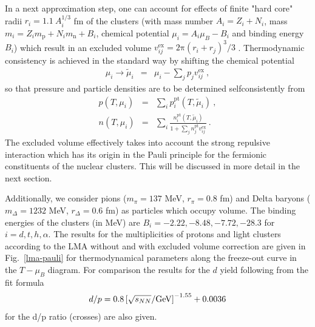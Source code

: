\documentclass[epj]{svjour}
\begin{document}
In a next approximation step, one can account for effects of finite "hard core" radii $r_i=1.1~A_i^{1/3}$ fm 
of the clusters (with mass number $A_i=Z_i+N_i$, mass $m_i=Z_i m_\mathrm p + N_i m_\mathrm n + B_i$, chemical potential $\mu_i=A_i \mu_B-B_i$ and binding energy $B_i$) which result in an excluded volume 
$v^\mathrm{ex}_{ij} = \mathrm{2\pi} (r_i + r_j)^3/{3}$ .
Thermodynamic consistency is achieved in the standard way by shifting the chemical potential 
\begin{eqnarray*}
	\mu_i \rightarrow \tilde\mu_i &=& \mu_i - \sum_j p_j v^\mathrm{ex}_{ij}~,
\end{eqnarray*}
so that pressure and particle densities are to be determined selfconsistently from
\begin{eqnarray*}
 p (T, \mu_i) &=&  \sum_i  p^\mathrm{pt}_i (T, \tilde\mu_i)~, \\
 n (T, \mu_i) &=& \sum_i \frac{n^\mathrm{pt}_i (T, \tilde\mu_i)}
{1 + \sum_j n^\mathrm{pt}_j v^\mathrm{ex}_{ij}}~.
\end{eqnarray*}
The excluded volume effectively takes into account the strong repulsive interaction which has its 
origin in the Pauli principle for the fermionic constituents of the nuclear clusters.
This will be discussed in more detail in the next section.

Additionally, we consider pions ($m_\pi=137$ MeV, $r_\pi=0.8$ fm) and Delta baryons 
($m_\Delta=1232$ MeV, $r_\Delta=0.6$ fm) as particles which occupy volume.
The binding energies of the clusters (in MeV) are
$B_i= -2.22, -8.48, -7.72, -28.3$ for $i=d,t,h,\alpha$.
The results for the multiplicities of protons and light clusters according to the LMA without and with excluded volume correction are given in Fig.~\ref{lma-pauli} for thermodynamical parameters along the freeze-out curve in the $T-\mu_B$ diagram.
For comparison the results for the $d$ yield following from the fit formula \cite{Feckova:2016kjx} 
\begin{equation}
d/p = 0.8 \left[\sqrt{s_{NN}}/{\rm GeV} \right]^{-1.55} + 0.0036
\end{equation}
for the d/p ratio (crosses)  are also given.
\end{document}
